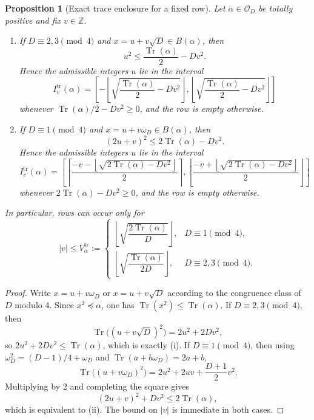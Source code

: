\documentclass[manuscript,screen]{acmart}
\renewcommand{\le}{\leqslant}
\renewcommand{\ge}{\geqslant}
\theoremstyle{plain}
\newtheorem{proposition}[theorem]{Proposition}
\theoremstyle{definition}
\theoremstyle{nonitalicremark}
\newcommand{\Z}{\mathbb{Z}}
\newcommand{\OD}{\mathcal{O}_D}
\newcommand{\wD}{\omega_D}
\newcommand{\Tr}{\operatorname{Tr}}
\begin{document}
\begin{proposition}[Exact trace enclosure for a fixed row]\label{prop:trace-row}
Let $\alpha\in\OD$ be totally positive and fix $v\in\Z$.
\begin{enumerate}[label=\textup{(\roman*)},itemsep=0.25em]
\item If $D\equiv 2,3 \pmod 4$ and $x=u+v\sqrt D\in B(\alpha)$, then
\[
u^2 \le \frac{\Tr(\alpha)}{2} - Dv^2.
\]
Hence the admissible integers $u$ lie in the interval
\[
I_v^{\mathrm{tr}}(\alpha)=\left[-\left\lfloor\sqrt{\frac{\Tr(\alpha)}{2}-Dv^2}\right\rfloor,
\left\lfloor\sqrt{\frac{\Tr(\alpha)}{2}-Dv^2}\right\rfloor\right]
\]
whenever $\Tr(\alpha)/2-Dv^2\ge 0$, and the row is empty otherwise.

\item If $D\equiv 1 \pmod 4$ and $x=u+v\wD\in B(\alpha)$, then
\[
(2u+v)^2 \le 2\Tr(\alpha)-Dv^2.
\]
Hence the admissible integers $u$ lie in the interval
\[
I_v^{\mathrm{tr}}(\alpha)=
\left[\left\lceil\frac{-v-\left\lfloor\sqrt{2\Tr(\alpha)-Dv^2}\right\rfloor}{2}\right\rceil,
\left\lfloor\frac{-v+\left\lfloor\sqrt{2\Tr(\alpha)-Dv^2}\right\rfloor}{2}\right\rfloor\right]
\]
whenever $2\Tr(\alpha)-Dv^2\ge 0$, and the row is empty otherwise.
\end{enumerate}
In particular, rows can occur only for
\[
|v|\le V_\alpha^{\mathrm{tr}}:=
\begin{cases}
\left\lfloor \sqrt{\dfrac{2\Tr(\alpha)}{D}}\right\rfloor,& D\equiv 1 \pmod 4,\\[1em]
\left\lfloor \sqrt{\dfrac{\Tr(\alpha)}{2D}}\right\rfloor,& D\equiv 2,3 \pmod 4.
\end{cases}
\]
\end{proposition}

\begin{proof}
Write $x=u+v\wD$ or $x=u+v\sqrt D$ according to the congruence class of $D$ modulo $4$.
Since $x^2\preccurlyeq \alpha$, one has $\Tr(x^2)\le \Tr(\alpha)$.
If $D\equiv 2,3 \pmod 4$, then
\[
\Tr\bigl((u+v\sqrt D)^2\bigr)=2u^2+2Dv^2,
\]
so $2u^2+2Dv^2\le \Tr(\alpha)$, which is exactly \textup{(i)}.
If $D\equiv 1 \pmod 4$, then using $\wD^2=(D-1)/4+\wD$ and $\Tr(a+b\wD)=2a+b$,
\[
\Tr\bigl((u+v\wD)^2\bigr)=2u^2+2uv+\frac{D+1}{2}v^2.
\]
Multiplying by $2$ and completing the square gives
\[
(2u+v)^2 + Dv^2 \le 2\Tr(\alpha),
\]
which is equivalent to \textup{(ii)}. The bound on $|v|$ is immediate in both cases.
\end{proof}
\end{document}
